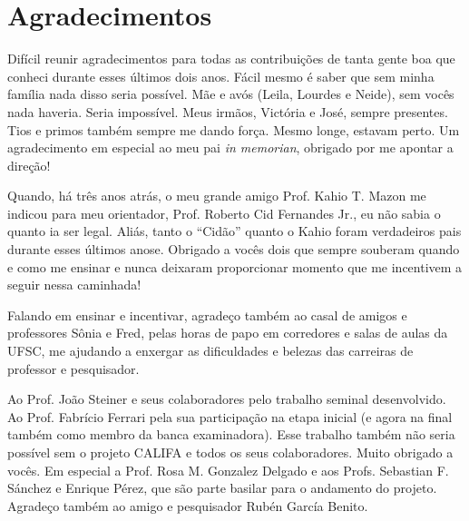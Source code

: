 

\chapter*{Agradecimentos}

Difícil reunir agradecimentos para todas as contribuições de tanta gente boa que conheci durante esses últimos dois
anos. Fácil mesmo é saber que sem minha família nada disso seria possível. Mãe e avós (Leila, Lourdes e Neide), sem
vocês nada haveria. Seria impossível. Meus irmãos, Victória e José, sempre presentes. Tios e primos também sempre me
dando força. Mesmo longe, estavam perto. Um agradecimento em especial ao meu pai {\em in memorian}, obrigado por me
apontar a direção!

Quando, há três anos atrás, o meu grande amigo Prof. Kahio T. Mazon me indicou para meu orientador, Prof. Roberto Cid
Fernandes Jr., eu não sabia o quanto ia ser legal. Aliás, tanto o ``Cidão'' quanto o Kahio foram verdadeiros pais
durante esses últimos anose. Obrigado a vocês dois que sempre souberam quando e como me ensinar e nunca deixaram
proporcionar momento que me incentivem a seguir nessa caminhada!

Falando em ensinar e incentivar, agradeço também ao casal de amigos e professores Sônia e Fred, pelas horas de papo em
corredores e salas de aulas da UFSC, me ajudando a enxergar as dificuldades e belezas das carreiras de professor e
pesquisador.

Ao Prof. João Steiner e seus colaboradores pelo trabalho seminal desenvolvido. Ao Prof. Fabrício Ferrari pela sua
participação na etapa inicial (e agora na final também como membro da banca examinadora). Esse trabalho também não seria
possível sem o projeto CALIFA e todos os seus colaboradores. Muito obrigado a vocês. Em especial a Prof. Rosa M.
Gonzalez Delgado e aos Profs. Sebastian F. Sánchez e Enrique Pérez, que são parte basilar para o andamento do projeto.
Agradeço também ao amigo e pesquisador Rubén García Benito.

